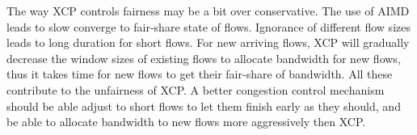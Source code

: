 \documentclass[11pt]{article}
\begin{document}
\vspace{1em}
The way XCP controls fairness may be a bit over conservative. The use
of AIMD leads to slow converge to fair-share state of
flows. Ignorance of different flow sizes leads to long duration for
short flows. For new arriving flows, XCP will gradually decrease the
window sizes of existing flows to allocate bandwidth for new flows,
thus it takes time for new flows to get their fair-share of
bandwidth. All these contribute to the unfairness of XCP.
A better congestion control mechanism should be able adjust to short
flows to let them finish early as they should, and be able to allocate
bandwidth to new flows more aggressively then XCP. 
\end{document}
